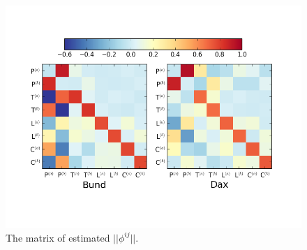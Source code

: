 \documentclass[a4paper,11pt]{article}
\begin{document}
\begin{figure}[H]
\centering
\includegraphics[width=\textwidth]{normphi1.png}
\vspace{-59pt}
\caption{The matrix of estimated $||\phi^{ij}||$.}
\label{normphi}
\end{figure}
\end{document}
